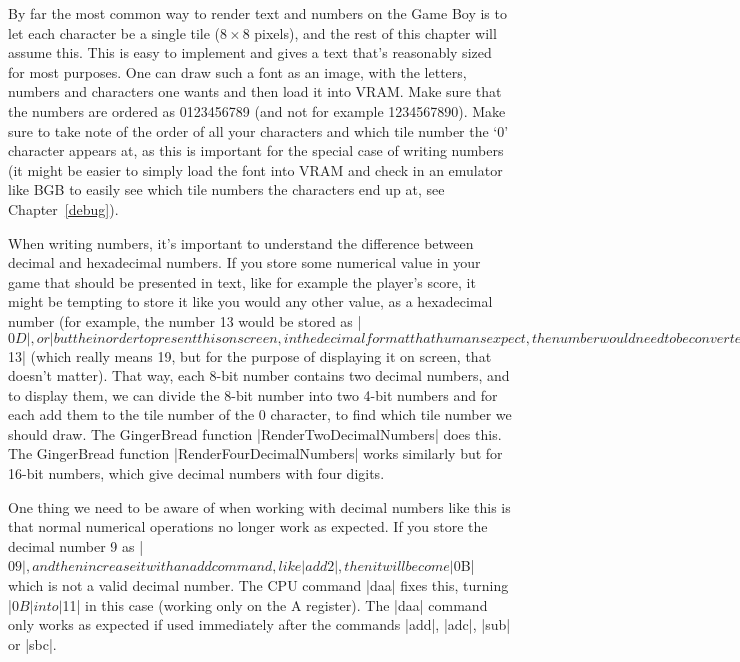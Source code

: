 \documentclass[11pt]{book}
\begin{document}
By far the most common way to render text and numbers on the Game Boy is to let each character be a single tile ($8\times8$ pixels), and the rest of this chapter will assume this. This is easy to implement and gives a text that's reasonably sized for most purposes. One can draw such a font as an image, with the letters, numbers and characters one wants and then load it into VRAM. Make sure that the numbers are ordered as 0123456789 (and not for example 1234567890). Make sure to take note of the order of all your characters and which tile number the ‘0’ character appears at, as this is important for the special case of writing numbers (it might be easier to simply load the font into VRAM and check in an emulator like BGB to easily see which tile numbers the characters end up at, see Chapter~\ref{debug}).

When writing numbers, it's important to understand the difference between decimal and hexadecimal numbers. If you store some numerical value in your game that should be presented in text, like for example the player's score, it might be tempting to store it like you would any other value, as a hexadecimal number (for example, the number 13 would be stored as |$0D|, or |%
 but the in order to present this on screen, in the decimal format that humans expect, the number would need to be converted, which is non-trivial on the Game Boy. Therefore, the common solution is to simply store the number is decimal form to begin with. That means that, for example, the number 13 should be stored as |$13| (which really means 19, but for the purpose of displaying it on screen, that doesn't matter). That way, each 8-bit number contains two decimal numbers, and to display them, we can divide the 8-bit number into two 4-bit numbers and for each add them to the tile number of the 0 character, to find which tile number we should draw. The GingerBread function |RenderTwoDecimalNumbers| does this. The GingerBread function |RenderFourDecimalNumbers| works similarly but for 16-bit numbers, which give decimal numbers with four digits.

One thing we need to be aware of when working with decimal numbers like this is that normal numerical operations no longer work as expected. If you store the decimal number 9 as |$09|, and then increase it with an add command, like |add 2|, then it will become |$0B| which is not a valid decimal number. The CPU command |daa| fixes this, turning |$0B| into |$11| in this case (working only on the A register). The |daa| command only works as expected if used immediately after the commands |add|, |adc|, |sub| or |sbc|.
\end{document}

